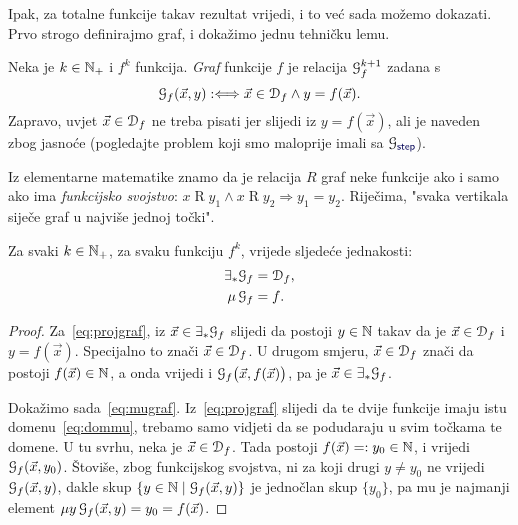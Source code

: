 Ipak, za totalne funkcije takav rezultat vrijedi, i to već sada možemo dokazati. Prvo strogo definirajmo graf, i dokažimo jednu tehničku lemu.

\begin{definicija}[{name=[graf brojevne funkcije]}]
Neka je $k\in{\mathbb N}_+$ i $f^k$ funkcija. \emph{Graf} funkcije $f$ je relacija $\mathcal G_{f}^{k+1}$ zadana s
\begin{equation}
    \label{eq:defgraf}\mathcal G_{f}(\vec x,y):\Longleftrightarrow\vec x\in\mathcal D_{f}\land y=f(\vec x)\text.
\end{equation}
Zapravo, uvjet $\vec x\in\mathcal D_{f}$ ne treba pisati jer slijedi iz $y=f(\vec x)$, ali je naveden zbog jasnoće (pogledajte problem koji smo maloprije imali sa $\graf{\f{step}}$).
\end{definicija}

\begin{napomena}[{name=[funkcijsko svojstvo grafova]}]\label{nap:graf=funsv}
Iz elementarne matematike znamo da je relacija $R$ graf neke funkcije ako i samo ako ima \emph{funkcijsko svojstvo}: $x\mathrel R y_1\land x\mathrel R y_2\Rightarrow y_1=y_2$. Riječima, "svaka vertikala siječe graf u najviše jednoj točki".
\end{napomena}

\begin{lema}[{name=[projekcija i minimizacija grafa]}]\label{lm:projmugraf}
Za svaki $k\in{\mathbb N}_+$, za svaku funkciju $f^k$, vrijede sljedeće jednakosti:
\begin{align}
    \label{eq:projgraf}\exists_*\mathcal G_{f}&=\mathcal D_{f}\text,\\
    \label{eq:mugraf}\mu\,\mathcal G_{f}&=f\text.
\end{align}
\end{lema}
\begin{proof}
Za~\eqref{eq:projgraf}, iz $\vec x\in\exists_*\mathcal G_{f}$ slijedi da postoji $y\in{\mathbb N}$ takav da je $\vec x\in\mathcal D_{f}$ i $y=f(\vec x)$. Specijalno to znači $\vec x\in\mathcal D_{f}$. U drugom smjeru, $\vec x\in\mathcal D_{f}$ znači da postoji $f(\vec x)\in{\mathbb N}$, a onda vrijedi i $\mathcal G_{f}\bigl(\vec x,f(\vec x)\bigr)$, pa je $\vec x\in\exists_*\mathcal G_{f}$.

Dokažimo sada~\eqref{eq:mugraf}. Iz~\eqref{eq:projgraf} slijedi da te dvije funkcije imaju istu domenu~\eqref{eq:dommu}, trebamo samo vidjeti da se podudaraju u svim točkama te domene. U tu svrhu, neka je $\vec x\in\mathcal D_{f}$. Tada postoji $f(\vec x)=:y_0\in{\mathbb N}$, i vrijedi $\mathcal G_{f}(\vec x,y_0)$. Štoviše, zbog funkcijskog svojstva, ni za koji drugi $y\ne y_0$ ne vrijedi $\mathcal G_{f}(\vec x,y)$, dakle skup $\{y\in{\mathbb N}\mid\mathcal G_{f}(\vec x,y)\}$ je jednočlan skup $\{y_0\}$, pa mu je najmanji element $\mu y\,\mathcal G_{f}(\vec x,y)=y_0=f(\vec x)$.
\end{proof}

